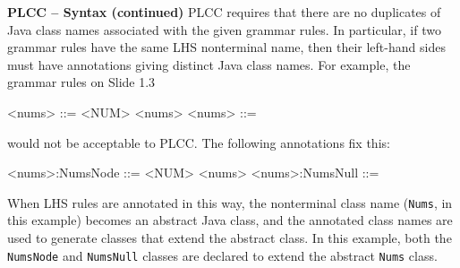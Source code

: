 \begin{minipage}[t]{\sw}
\slidenumber
\LARGE
{\bf PLCC -- Syntax (continued)}\exx
PLCC requires that there are no duplicates
of Java class names associated with the given grammar rules.
In particular, if two grammar rules have the same LHS nonterminal name,
then their left-hand sides must have annotations
giving distinct Java class names.
For example, the grammar rules on Slide 1.3
\begin{qv}
<nums> ::= <NUM> <nums>
<nums> ::= 
\end{qv}
would not be acceptable to PLCC.
The following annotations fix this:
\begin{qv}
<nums>:NumsNode ::= <NUM> <nums>
<nums>:NumsNull ::=
\end{qv}
When LHS rules are annotated in this way,
the nonterminal class name (\verb'Nums', in this example)
becomes an abstract Java class,
and the annotated class names are used
to generate classes that extend the abstract class.
In this example,
both the \verb'NumsNode' and \verb'NumsNull' classes
are declared to extend the abstract \verb'Nums' class.
\end{minipage}
\clearpage
